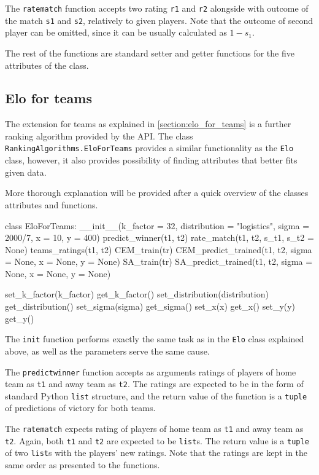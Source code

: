 \noindent The \texttt{rate\textunderscore match} function accepts two rating \texttt{r1} and \texttt{r2} alongside with outcome of the match \texttt{s1} and \texttt{s2}, relatively to given players. Note that the outcome of second player can be omitted, since it can be usually calculated as $1 - s_1$.

\noindent The rest of the functions are standard setter and getter functions for the five attributes of the class.

\subsection{Elo for teams}
The extension for teams as explained in \ref{section:elo_for_teams} is a further ranking algorithm provided by the API. The class \texttt{RankingAlgorithms.EloForTeams} provides a similar functionality as the \texttt{Elo} class, however, it also provides possibility of finding attributes that better fits given data.

More thorough explanation will be provided after a quick overview of the classes attributes and functions.

\begin{python}
class EloForTeams:
	__init__(k_factor = 32, distribution = "logistics", sigma = 2000/7, x = 10, y = 400)
	predict_winner(t1, t2)
	rate_match(t1, t2, s_t1, s_t2 = None)
	teams_ratings(t1, t2)
	CEM_train(tr)
	CEM_predict_trained(t1, t2, sigma = None, x = None, y = None)
	SA_train(tr)
	SA_predict_trained(t1, t2, sigma = None, x = None, y = None)
	
	set_k_factor(k_factor)
	get_k_factor()
	set_distribution(distribution)
	get_distribution()
	set_sigma(sigma)
	get_sigma()
	set_x(x)
	get_x()
	set_y(y)
	get_y()
\end{python}

\noindent The \texttt{\textunderscore \textunderscore init\textunderscore \textunderscore} function performs exactly the same task as in the \texttt{Elo} class explained above, as well as the parameters serve the same cause.

\noindent The \texttt{predict\textunderscore winner} function accepts as arguments ratings of players of home team as \texttt{t1} and away team as \texttt{t2}. The ratings are expected to be in the form of standard Python \texttt{list} structure, and the return value of the function is a \texttt{tuple} of predictions of victory for both teams.

\noindent The \texttt{rate\textunderscore match} expects rating of players of home team as \texttt{t1} and away team as \texttt{t2}. Again, both \texttt{t1} and \texttt{t2} are expected to be \texttt{list}s. The return value is a \texttt{tuple} of two \texttt{list}s with the players' new ratings. Note that the ratings are kept in the same order as presented to the functions.

